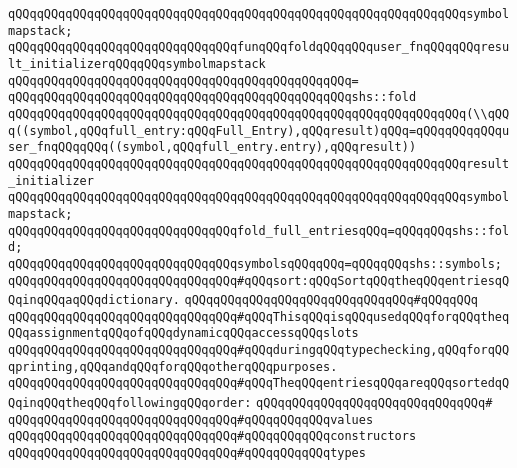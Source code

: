\verb|qQQqqQQqqQQqqQQqqQQqqQQqqQQqqQQqqQQqqQQqqQQqqQQqqQQqqQQqqQQqqQQqsymbolmapstack;|\newline
\newline
\verb|qQQqqQQqqQQqqQQqqQQqqQQqqQQqqQQqfunqQQqfoldqQQqqQQquser_fnqQQqqQQqresult_initializerqQQqqQQqsymbolmapstack|\newline
\verb|qQQqqQQqqQQqqQQqqQQqqQQqqQQqqQQqqQQqqQQqqQQqqQQq=|\newline
\verb|qQQqqQQqqQQqqQQqqQQqqQQqqQQqqQQqqQQqqQQqqQQqqQQqshs::fold|\newline
\verb|qQQqqQQqqQQqqQQqqQQqqQQqqQQqqQQqqQQqqQQqqQQqqQQqqQQqqQQqqQQqqQQq(\\qQQq((symbol,qQQqfull_entry:qQQqFull_Entry),qQQqresult)qQQq=qQQqqQQqqQQquser_fnqQQqqQQq((symbol,qQQqfull_entry.entry),qQQqresult))|\newline
\verb|qQQqqQQqqQQqqQQqqQQqqQQqqQQqqQQqqQQqqQQqqQQqqQQqqQQqqQQqqQQqqQQqresult_initializer|\newline
\verb|qQQqqQQqqQQqqQQqqQQqqQQqqQQqqQQqqQQqqQQqqQQqqQQqqQQqqQQqqQQqqQQqsymbolmapstack;|\newline
\newline
\verb|qQQqqQQqqQQqqQQqqQQqqQQqqQQqqQQqfold_full_entriesqQQq=qQQqqQQqshs::fold;|\newline
\newline
\verb|qQQqqQQqqQQqqQQqqQQqqQQqqQQqqQQqsymbolsqQQqqQQq=qQQqqQQqshs::symbols;|\newline
\newline
\verb|qQQqqQQqqQQqqQQqqQQqqQQqqQQqqQQq#qQQqsort:qQQqSortqQQqtheqQQqentriesqQQqinqQQqaqQQqdictionary.|\newline
\verb|qQQqqQQqqQQqqQQqqQQqqQQqqQQqqQQq#qQQqqQQq|\newline
\verb|qQQqqQQqqQQqqQQqqQQqqQQqqQQqqQQq#qQQqThisqQQqisqQQqusedqQQqforqQQqtheqQQqassignmentqQQqofqQQqdynamicqQQqaccessqQQqslots|\newline
\verb|qQQqqQQqqQQqqQQqqQQqqQQqqQQqqQQq#qQQqduringqQQqtypechecking,qQQqforqQQqprinting,qQQqandqQQqforqQQqotherqQQqpurposes.|\newline
\verb|qQQqqQQqqQQqqQQqqQQqqQQqqQQqqQQq#qQQqTheqQQqentriesqQQqareqQQqsortedqQQqinqQQqtheqQQqfollowingqQQqorder:|\newline
\verb|qQQqqQQqqQQqqQQqqQQqqQQqqQQqqQQq#|\newline
\verb|qQQqqQQqqQQqqQQqqQQqqQQqqQQqqQQq#qQQqqQQqqQQqvalues|\newline
\verb|qQQqqQQqqQQqqQQqqQQqqQQqqQQqqQQq#qQQqqQQqqQQqconstructors|\newline
\verb|qQQqqQQqqQQqqQQqqQQqqQQqqQQqqQQq#qQQqqQQqqQQqtypes|\newline
